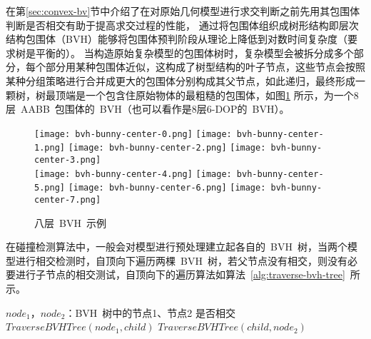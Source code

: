 在第\ref{sec:convex-bv}节中介绍了在对原始几何模型进行求交判断之前先用其包围体判断是否相交有助于提高求交过程的性能，
通过将包围体组织成树形结构即层次结构包围体（BVH）能够将包围体预判阶段从理论上降低到对数时间复杂度（要求树是平衡的）。
当构造原始复杂模型的包围体树时，复杂模型会被拆分成多个部分，每个部分用某种包围体近似，这构成了树型结构的叶子节点，这些节点会按照某种分组策略进行合并成更大的包围体分别构成其父节点，如此递归，最终形成一颗树，树最顶端是一个包含住原始物体的最粗糙的包围体，如图\ref{lbl:bvh-example}
所示，为一个8层~AABB~包围体的~BVH（也可以看作是8层6-DOP的~BVH）。
\begin{figure}[H]
  \centering
  \subcaptionbox*{\label{lbl:bvh-bunny-center-0.png}}
    {\texttt{[image: bvh-bunny-center-0.png]}}
  \subcaptionbox*{\label{lbl:bvh-bunny-center-1.png}}
    {\texttt{[image: bvh-bunny-center-1.png]}}
  \subcaptionbox*{\label{lbl:bvh-bunny-center-2.png}}
    {\texttt{[image: bvh-bunny-center-2.png]}}
  \subcaptionbox*{\label{lbl:bvh-bunny-center-3.png}}
    {\texttt{[image: bvh-bunny-center-3.png]}}
    \vspace{-0.3cm}
  \\\hspace{0.5cm} 
  \subcaptionbox*{\label{lbl:bvh-bunny-center-4.png}}
    {\texttt{[image: bvh-bunny-center-4.png]}}
  \subcaptionbox*{\label{lbl:bvh-bunny-center-5.png}}
    {\texttt{[image: bvh-bunny-center-5.png]}}
  \subcaptionbox*{\label{lbl:bvh-bunny-center-6.png}}
    {\texttt{[image: bvh-bunny-center-6.png]}}
  \subcaptionbox*{\label{lbl:bvh-bunny-center-7.png}}
    {\texttt{[image: bvh-bunny-center-7.png]}}
\caption{八层~BVH~示例}
\label{lbl:bvh-example}
\end{figure}

在碰撞检测算法中，一般会对模型进行预处理建立起各自的~BVH~树，当两个模型进行相交检测时，自顶向下遍历两棵~BVH~树，若父节点没有相交，则没有必要进行子节点的相交测试，自顶向下的遍历算法如算法~\ref{alg:traverse-bvh-tree}~所示。

\begin{algorithm}
\small
\caption{$TraverseBVHTree(node_1, node_2)$}
\label{alg:traverse-bvh-tree}
\begin{algorithmic}[1]
\REQUIRE
$node_1$，$node_2$：BVH~树中的节点1、节点2
\ENSURE
是否相交
    \RETURN \FALSE {}
\ELSE
         \ELSE
                \STATE $TraverseBVHTree(node_1, child)$ 
            \ENDFOR
         \ENDIF
    \ELSE
            \STATE $TraverseBVHTree(child, node_2)$  
         \ENDFOR
    \ENDIF
\ENDIF
\end{algorithmic}
\end{algorithm}

